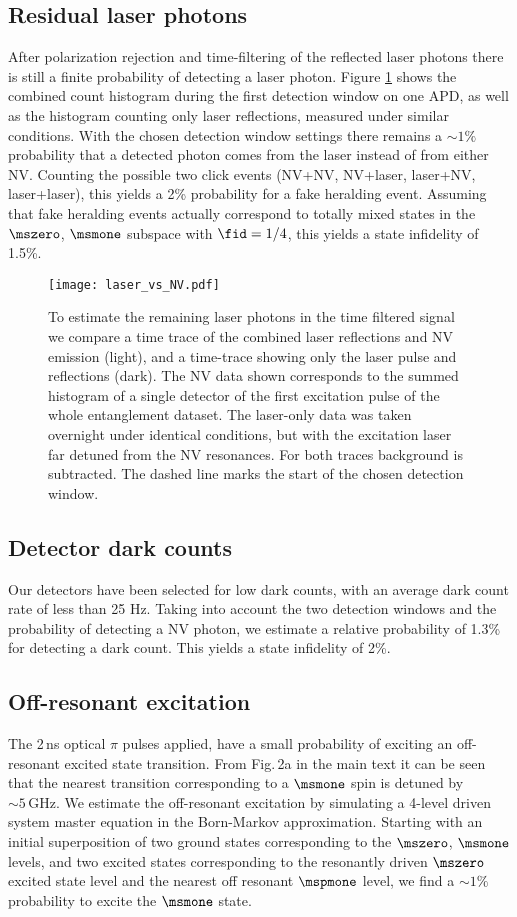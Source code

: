 \subsection{Residual laser photons}
After polarization rejection and time-filtering of the reflected laser photons there is still a finite probability of detecting a laser photon. Figure \ref{fig:laser_vs_nv} shows the combined count histogram during the first detection window on one APD, as well as the histogram counting only laser reflections, measured under similar conditions. With the chosen detection window settings there remains a $\sim 1\%$ probability that a detected photon comes from the laser instead of from either NV. Counting the possible two click events (NV+NV, NV+laser, laser+NV, laser+laser), this yields a 2\% probability for a fake heralding event. Assuming that fake heralding events actually correspond to totally mixed states in the $\mszero$, $\msmone$ subspace with $\fid=1/4$, this yields a state infidelity of 1.5\%.

\begin{figure}[h]
\centering
\texttt{[image: laser\_vs\_NV.pdf]}
\caption{To estimate the remaining laser photons in the time filtered signal we compare a time trace of the combined laser reflections and NV emission (light), and a time-trace showing only the laser pulse and reflections (dark). The NV data shown corresponds to the summed histogram of a single detector of the first excitation pulse of the whole entanglement dataset. The laser-only data was taken overnight under identical conditions, but with the excitation laser far detuned from the NV resonances. For both traces background is subtracted. The dashed line marks the start of the chosen detection window.}
\label{fig:laser_vs_nv}
\end{figure}


\subsection{Detector dark counts}
Our detectors have been selected for low dark counts, with an average dark count rate of less than 25 Hz. Taking into account the two detection windows and the probability of detecting a NV photon, we estimate a relative probability of 1.3\% for detecting a dark count. This yields a state infidelity of 2\%.

\subsection{Off-resonant excitation}
The 2\,ns optical $\pi$ pulses applied, have a small probability of exciting an off-resonant excited state transition. From Fig.\,2a in the main text it can be seen that the nearest transition corresponding to a $\msmone$ spin is detuned by $\sim 5\,\mathrm{GHz}$. We estimate the off-resonant excitation by simulating a 4-level driven system master equation in the Born-Markov approximation. Starting with an initial superposition of two ground states  corresponding to the $\mszero$, $\msmone$ levels, and two excited states corresponding to the resonantly driven $\mszero$ excited state level and the nearest off resonant $\mspmone$ level, we find a $\sim 1\%$ probability to excite the $\msmone$ state.

